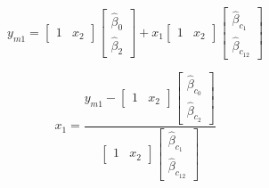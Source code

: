 \documentclass[../../paper.tex]{subfiles}
\begin{document}
\begin{equation}
  y_{m1} =
  \begin{bmatrix}
    1 & x_{2}
  \end{bmatrix}
  \begin{bmatrix}
    \hat{\beta}_{0} \\
    \hat{\beta}_{2}
  \end{bmatrix} +
  x_{1}
  \begin{bmatrix}
    1 & x_{2}
  \end{bmatrix}
  \begin{bmatrix}
    \hat{\beta}_{c_1} \\
    \hat{\beta}_{c_{12}}
  \end{bmatrix}
\end{equation}

\begin{equation}
  x_{1} =
  \frac{
    y_{m1} -
    \begin{bmatrix}
        1 & x_{2}
      \end{bmatrix}
      \begin{bmatrix}
        \hat{\beta}_{c_0} \\
        \hat{\beta}_{c_2}
      \end{bmatrix}
    }{
    \begin{bmatrix}
      1 & x_{2}
    \end{bmatrix}
    \begin{bmatrix}
      \hat{\beta}_{c_1} \\
      \hat{\beta}_{c_{12}}
    \end{bmatrix}
    }
\end{equation}
\end{document}
